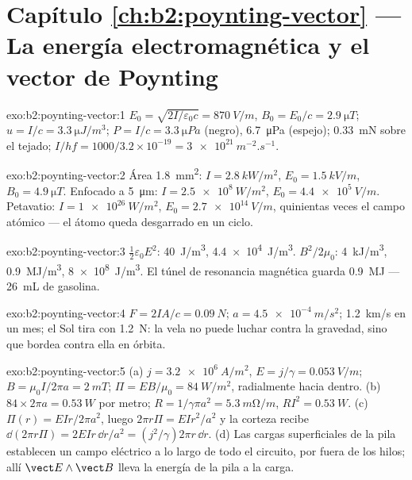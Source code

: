 \section*{Capítulo \ref{ch:b2:poynting-vector} --- La energía electromagnética y el vector de Poynting}

\begin{solution}{exo:b2:poynting-vector:1}
$E_0 = \sqrt{2I/\varepsilon_0c} = \qty{870}{V/m}$, $B_0 = E_0/c = \qty{2.9}{\micro T}$; $u = I/c
= \qty{3.3}{\micro J/m^3}$; $P = I/c = \qty{3.3}{\micro Pa}$ (negro), \qty{6.7}{\micro Pa}
(espejo); \qty{0.33}{mN} sobre el tejado; $I/hf = 1000/3.2 \times 10^{-19} = \qty{3e21}{m^{-2}.s^{-1}}$.
\end{solution}

\begin{solution}{exo:b2:poynting-vector:2}
Área \qty{1.8}{mm^2}: $I = \qty{2.8}{kW/m^2}$, $E_0 = \qty{1.5}{kV/m}$, $B_0 = \qty{4.9}{\micro T}$.
Enfocado a \qty{5}{\micro m}: $I = \qty{2.5e8}{W/m^2}$, $E_0 = \qty{4.4e5}{V/m}$. Petavatio:
$I = \qty{1e26}{W/m^2}$, $E_0 = \qty{2.7e14}{V/m}$, quinientas veces el campo
atómico --- el átomo queda desgarrado en un ciclo.
\end{solution}

\begin{solution}{exo:b2:poynting-vector:3}
$\tfrac12\varepsilon_0E^2$: \qty{40}{J/m^3}, \qty{4.4e4}{J/m^3}. $B^2/2\mu_0$: \qty{4}{kJ/m^3},
\qty{0.9}{MJ/m^3}, \qty{8e8}{J/m^3}. El túnel de resonancia magnética guarda \qty{0.9}{MJ} --- \qty{26}{mL}
de gasolina.
\end{solution}

\begin{solution}{exo:b2:poynting-vector:4}
$F = 2IA/c = \qty{0.09}{N}$; $a = \qty{4.5e-4}{m/s^2}$; \qty{1.2}{km/s} en un mes;
el Sol tira con \qty{1.2}{N}: la vela no puede luchar contra la gravedad,
sino que bordea contra ella en órbita.
\end{solution}

\begin{solution}{exo:b2:poynting-vector:5}
(a) $j = \qty{3.2e6}{A/m^2}$, $E = j/\gamma = \qty{0.053}{V/m}$; $B = \mu_0I/2\pi a = \qty{2}{mT}$;
$\Pi = EB/\mu_0 = \qty{84}{W/m^2}$, radialmente hacia dentro. (b) $84 \times 2\pi a = \qty{0.53}{W}$
por metro; $R = 1/\gamma\pi a^2 = \qty{5.3}{m\ohm/m}$, $RI^2 = \qty{0.53}{W}$. (c) $\Pi(r)
= EIr/2\pi a^2$, luego $2\pi r\Pi = EIr^2/a^2$ y la corteza recibe $\dd(2\pi r\Pi)
= 2EIr\,\dd r/a^2 = (j^2/\gamma)2\pi r\,\dd r$. (d) Las cargas superficiales de la
pila establecen un campo eléctrico a lo largo de todo el circuito, por
fuera de los hilos; allí $\vect E\wedge\vect B$ lleva la energía de la pila a la carga.
\end{solution}

